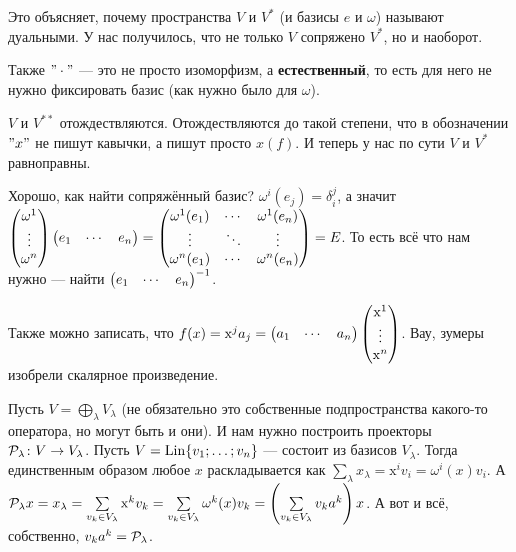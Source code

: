 \documentclass{article}
\begin{document}
\begin{itemize}
\begin{Proof}
        \end{Proof}
        \begin{Comment}
            Это объясняет, почему пространства $V$ и $V^*$ (и базисы $e$ и $\omega$) называют дуальными. У нас получилось, что не только $V$ сопряжено $V^*$, но и наоборот.
        \end{Comment}
        \begin{Comment}
            Также $"\cdot"$ --- это не просто изоморфизм, а \textbf{естественный}, то есть для него не нужно фиксировать базис (как нужно было для $\omega$).
        \end{Comment}
        \begin{Comment}
            $V$ и $V^{**}$ отождествляются. Отождествляются до такой степени, что в обозначении $"x"$ не пишут кавычки, а пишут просто $x(f)$. И теперь у нас по сути $V$ и $V^*$ равноправны.
        \end{Comment}
        \begin{Comment}
            Хорошо, как найти сопряжённый базис? $\omega^i(e_j)=\delta_i^j$, а значит $\left(\begin{matrix}\omega^1\\\vdots\\\omega^n\end{matrix}\right)\left(\begin{matrix}e_1 & \cdots & e_n\end{matrix}\right)=\left(\begin{matrix}
                \omega^1(e_1) & \cdots & \omega^1(e_n)\\
                \vdots & \ddots & \vdots\\
                \omega^n(e_1) & \cdots & \omega^n(e_n)
            \end{matrix}\right)=E$. То есть всё что нам нужно --- найти $\left(\begin{matrix}e_1 & \cdots & e_n\end{matrix}\right)^{-1}$.
        \end{Comment}
        \begin{Comment}
            Также можно записать, что $f(x)=\mathrm x^ja_j=\left(\begin{matrix}a_1 & \cdots & a_n\end{matrix}\right)\left(\begin{matrix}\mathrm x^1\\\vdots\\\mathrm x^n\end{matrix}\right)$. Вау, зумеры изобрели скалярное произведение.
        \end{Comment}
        \begin{Example}
            Пусть $V=\bigoplus_\lambda V_\lambda$ (не обязательно это собственные подпространства какого-то оператора, но могут быть и они). И нам нужно построить проекторы ${\mathcal{P}}_\lambda\colon V\to V_\lambda$. Пусть $V=\operatorname{Lin}\{v_1;\ldots;v_n\}$ --- состоит из базисов $V_\lambda$. Тогда единственным образом любое $x$ раскладывается как $\sum\limits_\lambda x_\lambda=\mathrm x^iv_i=\omega^i(x)v_i$. А ${\mathcal{P}}_\lambda x=x_\lambda=\sum\limits_{v_k\in V_\lambda}\mathrm x^kv_k=\sum\limits_{v_k\in V_\lambda}\omega^k(x)v_k=\left(\sum\limits_{v_k\in V_\lambda}v_ka^k\right)x$. А вот и всё, собственно, $v_ka^k={\mathcal{P}}_\lambda$.
        \end{Example}
    \end{itemize}
\end{document}
